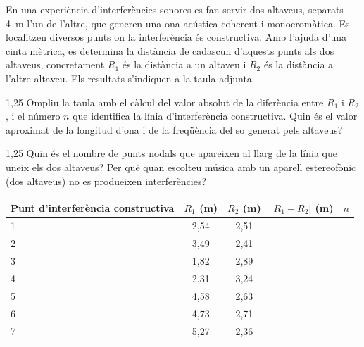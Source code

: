 En una experiència d'interferències sonores es fan servir dos altaveus, separats 4~m l'un de l'altre, que generen una ona acústica coherent i monocromàtica. Es localitzen diversos punts on la interferència és constructiva. Amb l'ajuda d'una cinta mètrica, es determina la distància de cadascun d'aquests punts als dos altaveus, concretament $R_1$ és la distància a un altaveu i $R_2$ és la distància a l'altre altaveu. Els resultats s'indiquen a la taula adjunta.


\begin{apartat}{1,25}
Ompliu la taula amb el càlcul del valor absolut de la diferència entre $R_1$ i $R_2$, i el número $n$ que identifica la línia d'interferència constructiva. Quin és el valor aproximat de la longitud d'ona i de la freqüència del so generat pels altaveus?
\end{apartat}

\begin{apartat}{1,25}
Quin és el nombre de punts nodals que apareixen al llarg de la línia que uneix els dos altaveus? Per què quan escolteu música amb un aparell estereofònic (dos altaveus) no es produeixen interferències?
\end{apartat}

\begin{center}
\begin{tabular}{|>{\raggedright}p{3cm}|c|c|>{\centering}p{2.2cm}|p{1.5cm}|}
\hline
Punt d'interferència constructiva & $R_1$ (m) & $R_2$ (m) & $|R_1-R_2|$ (m) & $n$ \\
\hline
1 & 2,54 & 2,51 & & \\ \hline
2 & 3,49 & 2,41 & & \\ \hline
3 & 1,82 & 2,89 & & \\ \hline
4 & 2,31 & 3,24 & & \\ \hline
5 & 4,58 & 2,63 & & \\ \hline
6 & 4,73 & 2,71 & & \\ \hline
7 & 5,27 & 2,36 & & \\ \hline
\end{tabular}
\end{center}

